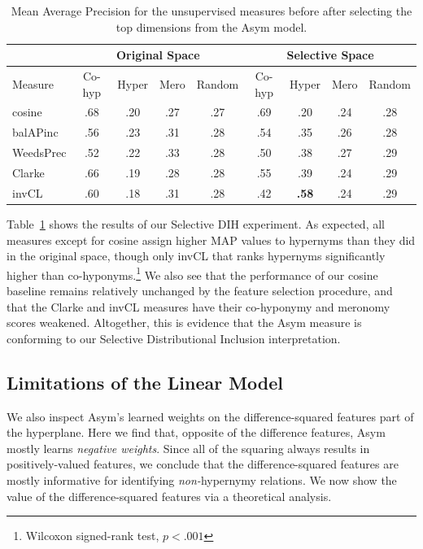 \begin{table}
  \centering
  \begin{small}
  \begin{tabular}{|l|cccc||cccc|}
    \hline
    & \multicolumn{4}{c||}{Original Space} & \multicolumn{4}{|c|}{Selective Space}\\
    \hline\hline
    Measure        & Co-hyp  & Hyper  & Mero  & Random  & Co-hyp  &   Hyper  & Mero & Random \\
    \hline
    cosine         &   .68   &   .20  &  .27  &    .27  &    .69  &     .20  &  .24 &    .28 \\
    balAPinc       &   .56   &   .23  &  .31  &    .28  &    .54  &     .35  &  .26 &    .28 \\
    WeedsPrec      &   .52   &   .22  &  .33  &    .28  &    .50  &     .38  &  .27 &    .29 \\
    Clarke         &   .66   &   .19  &  .28  &    .28  &    .55  &     .39  &  .24 &    .29 \\
    invCL          &   .60   &   .18  &  .31  &    .28  &    .42  & {\bf.58} &  .24 &    .29 \\
    \hline
  \end{tabular}
  \end{small}
  \caption{Mean Average Precision for the unsupervised measures before
  after selecting the top dimensions from the Asym model.}
  \label{tab:mapscores2}
\end{table}

Table~\ref{tab:mapscores2} shows the results of our Selective DIH experiment.
As expected, all measures except for cosine assign higher MAP values to
hypernyms than they did in the original space, though only invCL that ranks
hypernyms significantly higher than co-hyponyms.\footnote{Wilcoxon signed-rank
test, $p < .001$} We also see that the performance of our cosine baseline
remains relatively unchanged by the feature selection procedure, and that
the Clarke and invCL measures have their co-hyponymy and meronomy
scores weakened. Altogether, this is evidence that the Asym measure is
conforming to our Selective Distributional Inclusion interpretation.

\subsection{Limitations of the Linear Model}

We also inspect Asym's learned weights on the difference-squared features part
of the hyperplane. Here we find that, opposite of the difference features, Asym
mostly learns {\em negative weights}. Since all of the squaring always results
in positively-valued features, we conclude that the difference-squared features
are mostly informative for identifying {\em non-}hypernymy relations. We now
show the value of the difference-squared features via a theoretical analysis.

